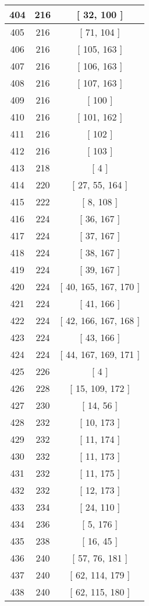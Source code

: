\begin{center}
\begin{longtable}[H]{|| c c c ||}
\\\hline
404 & 216 & [ 32, 100 ]
\\\hline
405 & 216 & [ 71, 104 ]
\\\hline
406 & 216 & [ 105, 163 ]
\\\hline
407 & 216 & [ 106, 163 ]
\\\hline
408 & 216 & [ 107, 163 ]
\\\hline
409 & 216 & [ 100 ]
\\\hline
410 & 216 & [ 101, 162 ]
\\\hline
411 & 216 & [ 102 ]
\\\hline
412 & 216 & [ 103 ]
\\\hline
413 & 218 & [ 4 ]
\\\hline
414 & 220 & [ 27, 55, 164 ]
\\\hline
415 & 222 & [ 8, 108 ]
\\\hline
416 & 224 & [ 36, 167 ]
\\\hline
417 & 224 & [ 37, 167 ]
\\\hline
418 & 224 & [ 38, 167 ]
\\\hline
419 & 224 & [ 39, 167 ]
\\\hline
420 & 224 & [ 40, 165, 167, 170 ]
\\\hline
421 & 224 & [ 41, 166 ]
\\\hline
422 & 224 & [ 42, 166, 167, 168 ]
\\\hline
423 & 224 & [ 43, 166 ]
\\\hline
424 & 224 & [ 44, 167, 169, 171 ]
\\\hline
425 & 226 & [ 4 ]
\\\hline
426 & 228 & [ 15, 109, 172 ]
\\\hline
427 & 230 & [ 14, 56 ]
\\\hline
428 & 232 & [ 10, 173 ]
\\\hline
429 & 232 & [ 11, 174 ]
\\\hline
430 & 232 & [ 11, 173 ]
\\\hline
431 & 232 & [ 11, 175 ]
\\\hline
432 & 232 & [ 12, 173 ]
\\\hline
433 & 234 & [ 24, 110 ]
\\\hline
434 & 236 & [ 5, 176 ]
\\\hline
435 & 238 & [ 16, 45 ]
\\\hline
436 & 240 & [ 57, 76, 181 ]
\\\hline
437 & 240 & [ 62, 114, 179 ]
\\\hline
438 & 240 & [ 62, 115, 180 ]
\\\hline

\end{longtable}
\end{center}
